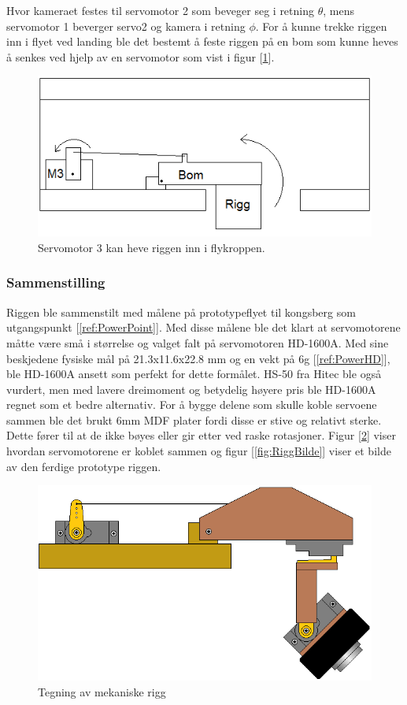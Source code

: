 Hvor kameraet festes til servomotor 2 som beveger seg i retning $\theta$, mens servomotor 1 beverger servo2 og kamera i retning $\phi$. For å kunne trekke riggen inn i flyet ved landing ble det bestemt å feste riggen på en bom som kunne heves å senkes ved hjelp av en servomotor som vist i figur [\ref{fig:bom}].

\begin{figure}[h!]
	\centering
	\includegraphics[scale=0.5]{img/Motor3.png}
	\caption{Servomotor 3 kan heve riggen inn i flykroppen.}
	\label{fig:bom}
\end{figure}


\subsubsection{Sammenstilling}
Riggen ble sammenstilt med målene på prototypeflyet til kongsberg som utgangspunkt [\ref{ref:PowerPoint}]. Med disse målene ble det klart at servomotorene måtte være små i størrelse og valget falt på servomotoren HD-1600A. Med sine beskjedene fysiske mål på 21.3x11.6x22.8 mm og en vekt på 6g [\ref{ref:PowerHD}], ble HD-1600A ansett som perfekt for dette formålet. HS-50 fra Hitec ble også vurdert, men med lavere dreimoment og betydelig høyere pris ble HD-1600A regnet som et bedre alternativ. For å bygge delene som skulle koble servoene sammen ble det brukt 6mm MDF plater fordi disse er stive og relativt sterke. Dette fører til at de ikke bøyes eller gir etter ved raske rotasjoner. Figur [\ref{fig:RiggTegn}] viser hvordan servomotorene er koblet sammen og figur [\ref{fig:RiggBilde}] viser et bilde av den ferdige prototype riggen. 

\begin{figure}[h!]
	\centering
	\includegraphics[scale=0.5]{img/RIGG_sattsammen.png}
	\caption{Tegning av mekaniske rigg}
	\label{fig:RiggTegn}
\end{figure}

